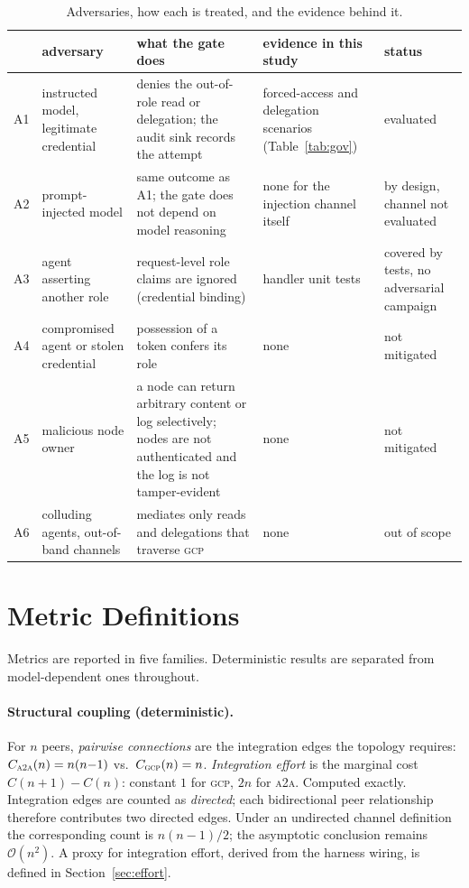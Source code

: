 \documentclass[conference,letterpaper]{IEEEtran}
\newcommand{\gcp}{\textsc{gcp}}
\newcommand{\ata}{\textsc{a2a}}
\newcommand{\bigoh}{\mathcal{O}}
\begin{document}
\begin{table}[t]
\centering
\caption{Adversaries, how each is treated, and the evidence behind it.}
\label{tab:threat}
\footnotesize
\setlength{\tabcolsep}{4pt}
\begin{tabular}{@{}lp{3.3cm}p{4.6cm}p{4.0cm}p{3.1cm}@{}}
\toprule
 & adversary & what the gate does & evidence in this study & status \\
\midrule
A1 & instructed model, legitimate credential & denies the out-of-role read or delegation; the audit sink records the attempt & forced-access and delegation scenarios (Table~\ref{tab:gov}) & evaluated \\
A2 & prompt-injected model & same outcome as A1; the gate does not depend on model reasoning & none for the injection channel itself & by design, channel not evaluated \\
A3 & agent asserting another role & request-level role claims are ignored (credential binding) & handler unit tests & covered by tests, no adversarial campaign \\
A4 & compromised agent or stolen credential & possession of a token confers its role & none & not mitigated \\
A5 & malicious node owner & a node can return arbitrary content or log selectively; nodes are not authenticated and the log is not tamper-evident & none & not mitigated \\
A6 & colluding agents, out-of-band channels & mediates only reads and delegations that traverse \gcp{} & none & out of scope \\
\bottomrule
\end{tabular}
\end{table}

\section{Metric Definitions}
\label{sec:metrics}

Metrics are reported in five families. Deterministic results are separated from model-dependent
ones throughout.

\paragraph{Structural coupling (deterministic).} For $n$ peers, \emph{pairwise connections} are the
integration edges the topology requires: $C_{\ata{}}(n)=n(n{-}1)$ vs.\ $C_{\gcp{}}(n)=n$.
\emph{Integration effort} is the marginal cost $C(n{+}1)-C(n)$: constant $1$ for \gcp{}, $2n$ for
\ata{}. Computed exactly. Integration edges are counted as \emph{directed}; each bidirectional
peer relationship therefore contributes two directed edges. Under an undirected channel definition the
corresponding count is $n(n{-}1)/2$; the asymptotic conclusion remains $\bigoh(n^2)$. A proxy for integration effort, derived from the
harness wiring, is defined in Section~\ref{sec:effort}.
\end{document}
